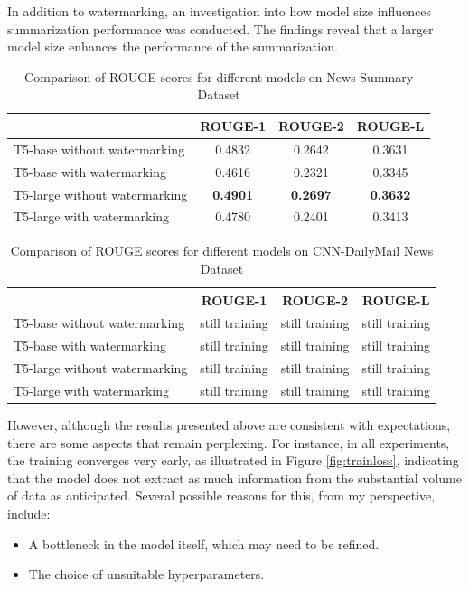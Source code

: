 \documentclass{article}
\begin{document}
In addition to watermarking, an investigation into how model size influences summarization performance was conducted. The findings reveal that a larger model size enhances the performance of the summarization.\\

\begin{table}[h]
	\centering
	\begin{tabular}{lccc}
		\hline
		& ROUGE-1 & ROUGE-2 & ROUGE-L \\
		\hline
		T5-base without watermarking  &  0.4832 &  0.2642 &  0.3631 \\
		T5-base with watermarking     &  0.4616 &  0.2321 &  0.3345 \\
		T5-large without watermarking &  \textbf{0.4901} &  \textbf{0.2697} &  \textbf{0.3632} \\
		T5-large with watermarking    &  0.4780 &  0.2401 &  0.3413 \\
		\hline
	\end{tabular}
	\caption{Comparison of ROUGE scores for different models on News Summary Dataset}
	\label{tab:rouge-scores_news}
\end{table}

\begin{table}[h]
	\centering
	\begin{tabular}{lccc}
		\hline
		& ROUGE-1 & ROUGE-2 & ROUGE-L \\
		\hline
		T5-base without watermarking  &  still training &  still training &  still training \\
		T5-base with watermarking     &  still training &  still training &  still training \\
		T5-large without watermarking &  still training &  still training &  still training \\
		T5-large with watermarking    &  still training &  still training &  still training \\
		\hline
	\end{tabular}
	\caption{Comparison of ROUGE scores for different models on CNN-DailyMail News Dataset}
	\label{tab:rouge-scores_cnn}
\end{table}

However, although the results presented above are consistent with expectations, there are some aspects that remain perplexing. For instance, in all experiments, the training converges very early, as illustrated in Figure \ref{fig:trainloss}, indicating that the model does not extract as much information from the substantial volume of data as anticipated. Several possible reasons for this, from my perspective, include:
\begin{itemize}
	\item A bottleneck in the model itself, which may need to be refined.
	\item The choice of unsuitable hyperparameters.
\end{itemize}
\end{document}
